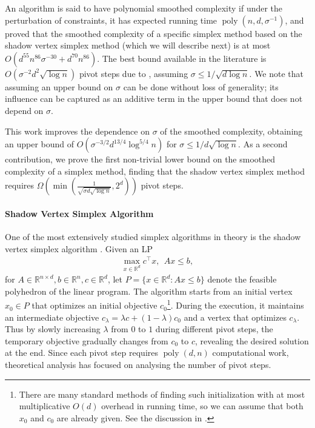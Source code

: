 \documentclass{article}\usepackage[a4paper,margin=20mm]{geometry}
\newcommand{\R}{\mathbb R}
\newcommand{\poly}{\operatorname{poly}}
\begin{document}
An algorithm is said to have polynomial smoothed complexity if under the perturbation of constraints, it has expected running
time $\poly(n,d,\sigma^{-1})$, and \cite{ST04} proved that the smoothed complexity of a specific simplex method based on the shadow vertex simplex method (which we will describe next) is at most
$O(d^{55}n^{86}\sigma^{-30} + d^{70}n^{86})$.
The best bound available in the literature is
$O(\sigma^{-2}d^2\sqrt{\log n})$ pivot steps due to \cite{DH18}, assuming $\sigma \leq 1/\sqrt{d\log n}$.
We note that assuming an upper bound on $\sigma$ can be done without loss of generality;
its influence can be captured as an additive term in the upper bound that does not depend on $\sigma$.

This work improves the dependence on $\sigma$ of the smoothed complexity, obtaining an upper bound of $O(\sigma^{-3/2} d^{13/4} \log^{5/4} n)$
for $\sigma \leq 1/d\sqrt{\log n}$.
As a second contribution, we prove the first non-trivial lower bound on the smoothed complexity of a simplex method,
finding that the shadow vertex simplex method requires $\Omega(\min(\frac{1}{\sqrt{\sigma d \sqrt{\log n}}}, 2^d))$
pivot steps.


\paragraph{Shadow Vertex Simplex Algorithm}
One of the most extensively studied simplex algorithms in theory is the shadow vertex simplex algorithm \cite{gas55,b82}.
Given an LP
\begin{align*}
    \max_{x\in \R^d} c^\top x, ~~ A x \leq b,
\end{align*}
for $A \in \R^{n\times d}, b\in \R^n, c\in \R^d$,
let $P = \{x\in \R^d : A x \leq b\}$ denote the feasible polyhedron of the linear program.
The algorithm starts from an initial vertex $x_0 \in P$ that optimizes an initial objective $c_0$\footnote{There are many standard methods of finding such initialization with at most multiplicative $O(d)$ overhead in running time, so we can assume that both $x_0$ and $c_0$ are already given. See the discussion in \cite{DH18}.}.
During the execution, it maintains an intermediate objective $c_\lambda = \lambda c + (1-\lambda) c_0$ and a vertex that optimizes $c_{\lambda}$. 
Thus by slowly increasing $\lambda$ from $0$ to $1$ during different pivot steps, the temporary objective gradually changes from $c_0$ to $c$, revealing the desired solution at the end.
Since each pivot step requires $\poly(d,n)$ computational work, theoretical analysis
has focused on analysing the number of pivot steps.
\end{document}
